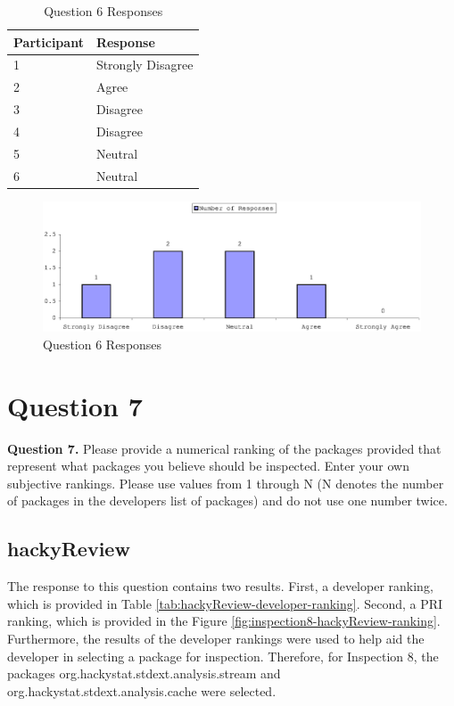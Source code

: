 \begin{table}[!h]
  \begin{center}
    \caption{Question 6 Responses}
    \label{tab:pre-selection-questionnaire-results-6}
    \begin{tabular}{|p{5.0cm}|p{8.0cm}|} \hline
{\bf Participant} & {\bf Response} \\ \hline
1 & Strongly Disagree \\ \hline
2 & Agree \\ \hline
3 & Disagree \\ \hline
4 & Disagree \\ \hline
5 & Neutral \\ \hline
6 & Neutral \\ \hline
    \end{tabular}
  \end{center}
\end{table}

\begin{figure}[htb]
  \centering
  \includegraphics[width=1.0\textwidth]{figs/Results/pre-selection-questionnaire-6.eps}
  \caption{Question 6 Responses}
  \label{fig:pre-selection-questionnaire-results-6}
\end{figure}


\clearpage
\section{Question 7}
\label{appendix:section:question7}
\noindent \textbf{Question 7.} Please provide a numerical ranking of the
packages provided that represent what packages you believe should be
inspected. Enter your own subjective rankings. Please use values from 1
through N (N denotes the number of packages in the developers list of
packages) and do not use one number twice.

\subsection{hackyReview}
The response to this question contains two results. First, a developer
ranking, which is provided in Table
\ref{tab:hackyReview-developer-ranking}. Second, a PRI ranking, which is
provided in the Figure \ref{fig:inspection8-hackyReview-ranking}.
Furthermore, the results of the developer rankings were used to help aid
the developer in selecting a package for inspection. Therefore, for
Inspection 8, the packages org.hackystat.stdext.analysis.stream and
org.hackystat.stdext.analysis.cache were selected.

